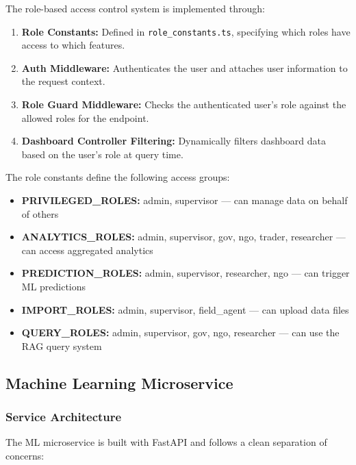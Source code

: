 The role-based access control system is implemented through:
\begin{enumerate}
  \item \textbf{Role Constants:} Defined in \texttt{role\_constants.ts}, specifying which roles have access to which features.
  \item \textbf{Auth Middleware:} Authenticates the user and attaches user information to the request context.
  \item \textbf{Role Guard Middleware:} Checks the authenticated user's role against the allowed roles for the endpoint.
  \item \textbf{Dashboard Controller Filtering:} Dynamically filters dashboard data based on the user's role at query time.
\end{enumerate}

The role constants define the following access groups:
\begin{itemize}
  \item \textbf{PRIVILEGED\_ROLES:} admin, supervisor --- can manage data on behalf of others
  \item \textbf{ANALYTICS\_ROLES:} admin, supervisor, gov, ngo, trader, researcher --- can access aggregated analytics
  \item \textbf{PREDICTION\_ROLES:} admin, supervisor, researcher, ngo --- can trigger ML predictions
  \item \textbf{IMPORT\_ROLES:} admin, supervisor, field\_agent --- can upload data files
  \item \textbf{QUERY\_ROLES:} admin, supervisor, gov, ngo, researcher --- can use the RAG query system
\end{itemize}

\subsection{Machine Learning Microservice}

\subsubsection{Service Architecture}

The ML microservice is built with FastAPI and follows a clean separation of concerns:

